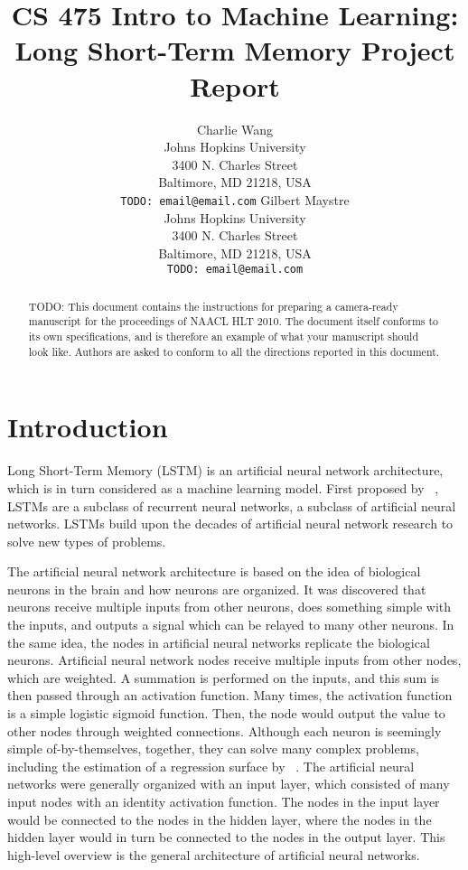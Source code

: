 \documentclass[11pt,letterpaper]{article}
\title{CS 475 Intro to Machine Learning: Long Short-Term Memory Project Report}
\author{Charlie Wang\\
  Johns Hopkins University\\
  3400 N. Charles Street\\
  Baltimore, MD 21218, USA\\
  {\tt TODO: email@email.com}
  \And
  Gilbert Maystre \\
  Johns Hopkins University\\
  3400 N. Charles Street\\
  Baltimore, MD 21218, USA\\
  {\tt TODO: email@email.com}}
\date{}
\begin{document}
\maketitle
\begin{abstract}
  TODO: This document contains the instructions for preparing a camera-ready
  manuscript for the proceedings of NAACL HLT 2010. The document itself conforms
  to its own specifications, and is therefore an example of what
  your manuscript should look like.  Authors are asked to conform to
  all the directions reported in this document.
\end{abstract}

\section{Introduction}

Long Short-Term Memory (LSTM) is an artificial neural network architecture, which is in turn considered as a machine learning model. First proposed by ~\cite{Hochreiter:97}, LSTMs are a subclass of recurrent neural networks, a subclass of artificial neural networks. LSTMs build upon the decades of artificial neural network research to solve new types of problems.

The artificial neural network architecture is based on the idea of biological neurons in the brain and how neurons are organized. It was discovered that neurons receive multiple inputs from other neurons, does something simple with the inputs, and outputs a signal which can be relayed to many other neurons. In the same idea, the nodes in artificial neural networks replicate the biological neurons. Artificial neural network nodes receive multiple inputs from other nodes, which are weighted. A summation is performed on the inputs, and this sum is then passed through an activation function. Many times, the activation function is a simple logistic sigmoid function. Then, the node would output the value to other nodes through weighted connections. Although each neuron is seemingly simple of-by-themselves, together, they can solve many complex problems, including the estimation of a regression surface by ~\cite{Specht:91}. The artificial neural networks were generally organized with an input layer, which consisted of many input nodes with an identity activation function. The nodes in the input layer would be connected to the nodes in the hidden layer, where the nodes in the hidden layer would in turn be connected to the nodes in the output layer. This high-level overview is the general architecture of artificial neural networks.
\end{document}
